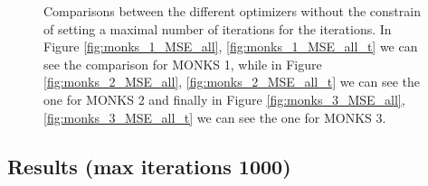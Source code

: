 \begin{figure}[t!]{}
\begin{subfigure}{0.45\textwidth}
                \end{subfigure}
                \caption{Comparisons between the different optimizers without the constrain of setting a maximal
                number of iterations for the iterations. In Figure \ref{fig:monks_1_MSE_all}, \ref{fig:monks_1_MSE_all_t} we can see the
                comparison for MONKS 1, while in Figure \ref{fig:monks_2_MSE_all}, \ref{fig:monks_2_MSE_all_t} we can see the one for
                MONKS 2 and finally in Figure \ref{fig:monks_3_MSE_all},  \ref{fig:monks_3_MSE_all_t} we can see the one for MONKS 3.}
                \label{fig:monks_MSE_all}
            \end{figure}


        \subsection{Results (max iterations 1000)} %
        \label{sub:results_}

